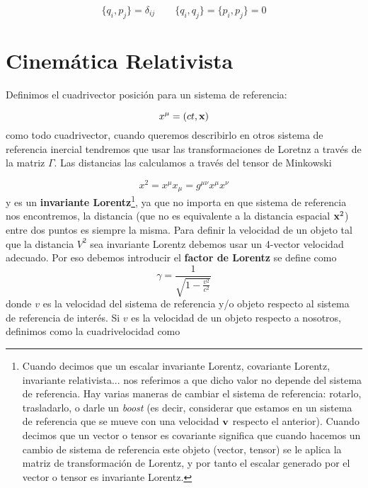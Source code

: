 \begin{equation}
	\{q_i,p_j\} = \delta_{ij}  \qquad \{q_i,q_j\}=\{p_i,p_j\}=0
\end{equation}



\section{Cinemática Relativista}

Definimos el cuadrivector posición para un sistema de referencia:

\begin{equation}
	x^\mu = (ct,\mathbf{x})
\end{equation}
como todo cuadrivector, cuando queremos describirlo en otros sistema de referencia inercial tendremos que usar las transformaciones de Loretnz a través de la matriz $\Gamma$. Las distancias las calculamos a través del tensor de Minkowski 

\begin{equation}
	x^2 = x^\mu x_\mu = g^{\mu \nu} x^{\mu} x^{\nu}
\end{equation}
y es un \textbf{invariante Lorentz}\footnote{Cuando decimos que un escalar invariante Lorentz, covariante Lorentz, invariante relativista... nos referimos a que dicho valor no depende del sistema de referencia. Hay varias maneras de cambiar el sistema de referencia: rotarlo, trasladarlo, o darle un \textit{boost} (es decir, considerar que estamos en un sistema de referencia que se mueve con una velocidad $\mathbf{v}$ respecto el anterior). Cuando decimos que un vector o tensor es covariante significa que cuando hacemos un cambio de sistema de referencia este objeto (vector, tensor) se le aplica la matriz de transformación de Lorentz, y por tanto el escalar generado por el vector o tensor es invariante Lorentz.}, ya que no importa en que sistema de referencia nos encontremos, la distancia (que no es equivalente a la distancia espacial $\mathbf{x}^2$) entre dos puntos es siempre la misma. Para definir la velocidad de un objeto tal que la distancia $V^2$ sea invariante Lorentz debemos usar un 4-vector velocidad adecuado. Por eso debemos introducir el \textbf{factor de Lorentz} se define como
\begin{equation}
	\gamma= \frac{1}{\sqrt{1-\frac{v^2}{c^2}}}
\end{equation}
donde $v$ es la velocidad del sistema de referencia y/o objeto respecto al sistema de referencia de interés. Si $v$ es la velocidad de un objeto respecto a nosotros, definimos como la cuadrivelocidad como

